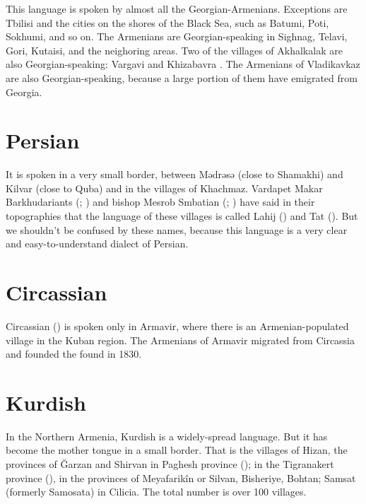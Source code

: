 This language is spoken by almost all the Georgian-Armenians. Exceptions are Tbilisi and the cities on the shores of the Black Sea, such as Batumi, Poti, Sokhumi, and so on. The Armenians are Georgian-speaking in Sighnag, Telavi, Gori, Kutaisi, and the neighoring areas. Two of the villages of Akhalkalak are also Georgian-speaking: Vargavi and Khizabavra . The Armenians of Vladikavkaz are also Georgian-speaking, because a large portion of them have emigrated from Georgia. 

\section{Persian}

It is spoken in a very small border, between Mədrəsə (close to Shamakhi) and Kilvar (close to Quba) and in the villages of Khachmaz. Vardapet Makar Barkhudariants (; ) and bishop Mesrob Smbatian (; ) have said in their topographies that the language of these villages is called Lahij () and Tat (). But we shouldn't be confused by these names, because this language is a very clear and easy-to-understand dialect of Persian.


\begin{adjarianpage}\label{page:33}\end{adjarianpage}%



\section{Circassian}

Circassian () is spoken only in Armavir, where there is an Armenian-populated village in the Kuban region. The Armenians of Armavir migrated from Circassia and founded the found in 1830.



\section{Kurdish}

In the Northern Armenia, Kurdish is a widely-spread language. But it has become the mother tongue in a small border. That is the villages of Hizan, the provinces of Ğarzan and Shirvan in Paghesh province (); in the Tigranakert province (), in the provinces of Meyafarikîn or Silvan, Bisheriye, Bohtan; Samsat (formerly Samosata) in Cilicia. The total number is over 100 villages. 

